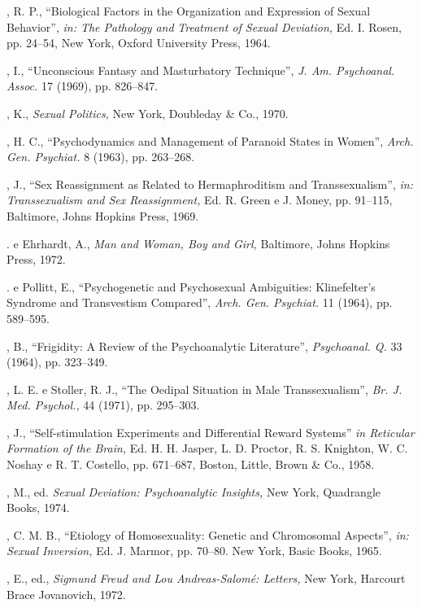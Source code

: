 \begin{description}
, R. P., ``Biological Factors in the Organization and
Expression of Sexual Behavior'', \textit{in: The Pathology and
}\textit{Treatment of Sexual Deviation, } Ed. I. Rosen, pp. 24--54, New York,
Oxford University Press, 1964.

, I., ``Unconscious Fantasy and Masturbatory
Technique'', \textit{J. Am. Psychoanal. Assoc. } 17 (1969), pp.
826--847.

, K., \textit{ Sexual Politics, }New York, Doubleday \& Co., 1970.

, H. C., ``Psychodynamics and Management of Paranoid States
in Women'', \textit{ Arch. Gen. Psychiat. }8 (1963), pp. 263--268.

, J., ``Sex Reassignment as Related to Hermaphroditism and
Transsexualism'', \textit{ in: Transsexualism and Sex Reassignment,}
Ed. R. Green e J. Money, pp. 91--115, Baltimore, Johns Hopkins Press, 1969.

. e Ehrhardt, A., \textit{Man and Woman, Boy and Girl,}
Baltimore, Johns Hopkins Press, 1972.

. e Pollitt, E., ``Psychogenetic and Psychosexual
Ambiguities: Klinefelter's Syndrome and Transvestism
Compared'', \textit{Arch. Gen. Psychiat.} 11 (1964), pp. 589--595.

, B., ``Frigidity: A Review of the Psychoanalytic
Literature'', \textit{Psychoanal. Q. }33 (1964), pp. 323--349.

, L. E. e Stoller, R. J., ``The Oedipal Situation in Male
Transsexualism'', \textit{Br. J. Med. Psychol., }44 (1971), pp.
295--303.

, J., ``Self-stimulation Experiments and Differential Reward
Systems'' \textit{in Reticular Formation of the Brain, }Ed. H. H.
Jasper, L. D. Proctor, R. S. Knighton, W. C. Noshay e R. T. Costello, pp. 671--687,
Boston, Little, Brown \& Co., 1958.

, M., ed. \textit{ Sexual Deviation: Psychoanalytic Insights, }New York,
Quadrangle Books, 1974.

, C. M. B., ``Etiology of Homosexuality: Genetic and
Chromosomal Aspects'', \textit{in: Sexual Inversion, }Ed. J. Marmor,
pp. 70--80. New York, Basic Books, 1965.

, E., ed., \textit{Sigmund Freud and Lou Andreas-Salomé: Letters, }New
York, Harcourt Brace Jovanovich, 1972.


\end{description}
